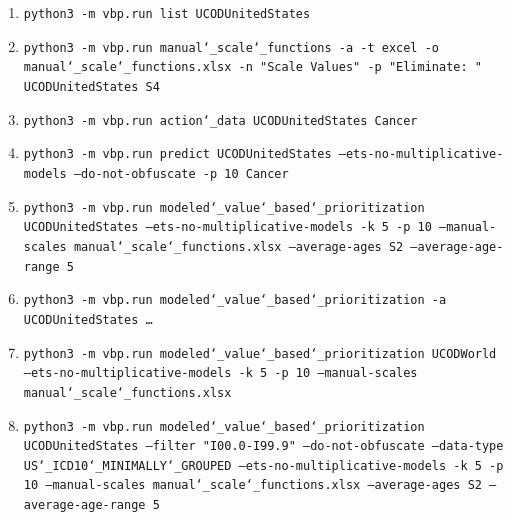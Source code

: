 \documentclass[10pt, a4paper, twocolumn]{IEEEconf}
\begin{document}
\begin{enumerate}
  \item \label{cmdlist} \texttt{python3 -m vbp.run list UCODUnitedStates}
  \item \label{cmdmanualscales} \texttt{python3 -m vbp.run manual\char`_scale\char`_functions -a -t excel -o manual\char`_scale\char`_functions.xlsx -n "Scale Values" -p "Eliminate: " UCODUnitedStates S4}
  \item \label{cmdcancerdata} \texttt{python3 -m vbp.run action\char`_data UCODUnitedStates Cancer}
  \item \label{cmdcancerpredict} \texttt{python3 -m vbp.run predict UCODUnitedStates --ets-no-multiplicative-models --do-not-obfuscate -p 10 Cancer}
  \item \label{cmdlongtermcomparable} \texttt{python3 -m vbp.run modeled\char`_value\char`_based\char`_prioritization UCODUnitedStates --ets-no-multiplicative-models -k 5 -p 10 --manual-scales manual\char`_scale\char`_functions.xlsx --average-ages S2 --average-age-range 5}
  \item \label{cmdmodeledvbpus} \texttt{python3 -m vbp.run modeled\char`_value\char`_based\char`_prioritization -a UCODUnitedStates \ldots}
  \item \label{cmdmodeledvbpworld} \texttt{python3 -m vbp.run modeled\char`_value\char`_based\char`_prioritization UCODWorld --ets-no-multiplicative-models -k 5 -p 10 --manual-scales manual\char`_scale\char`_functions.xlsx}
  \item \label{cmdfilter} \texttt{python3 -m vbp.run modeled\char`_value\char`_based\char`_prioritization UCODUnitedStates --filter "I00.0-I99.9" --do-not-obfuscate --data-type US\char`_ICD10\char`_MINIMALLY\char`_GROUPED --ets-no-multiplicative-models -k 5 -p 10 --manual-scales manual\char`_scale\char`_functions.xlsx --average-ages S2 --average-age-range 5}
\end{enumerate}
\end{document}
